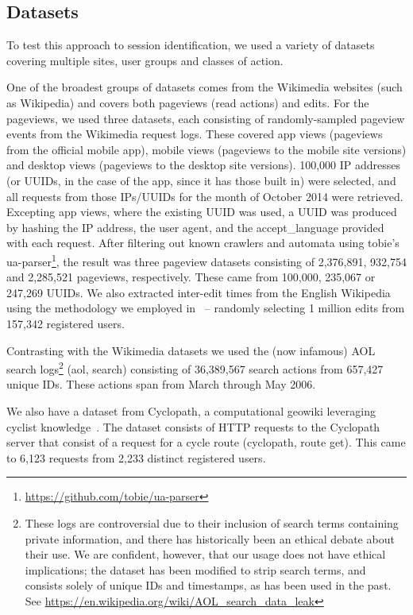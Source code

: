\subsection{Datasets}
To test this approach to session identification, we used a variety of datasets covering multiple sites, user groups and classes of action.

 One of the broadest groups of datasets comes from the Wikimedia websites (such as Wikipedia) and covers both pageviews (read actions) and edits. For the pageviews, we used three datasets, each consisting of randomly-sampled pageview events from the Wikimedia request logs. These covered app views (pageviews from the official mobile app), mobile views (pageviews to the mobile site versions) and desktop views (pageviews to the desktop site versions). 100,000 IP addresses (or UUIDs, in the case of the app, since it has those built in) were selected, and all requests from those IPs/UUIDs for the month of October 2014 were retrieved. Excepting app views, where the existing UUID was used, a UUID was produced by hashing the IP address, the user agent, and the accept\_language provided with each request. After filtering out known crawlers and automata using tobie's ua-parser\footnote{\url{https://github.com/tobie/ua-parser}}, the result was three pageview datasets consisting of 2,376,891, 932,754 and 2,285,521 pageviews, respectively. These came from 100,000, 235,067 or 247,269 UUIDs. We also extracted inter-edit times from the English Wikipedia using the methodology we employed in~\cite{geiger2013using} -- randomly selecting 1 million edits from 157,342 registered users.

 Contrasting with the Wikimedia datasets we used the (now infamous) AOL search logs\footnote{These logs are controversial due to their inclusion of search terms containing private information, and there has historically been an ethical debate about their use. We are confident, however, that our usage does not have ethical implications; the dataset has been modified to strip search terms, and consists solely of unique IDs and timestamps, as has been used in the past.\cite{mehrzadi2012onextracting}  See \url{https://en.wikipedia.org/wiki/AOL_search_data_leak}} (aol, search) consisting of 36,389,567 search actions from 657,427 unique IDs. These actions span from March through May 2006.

 We also have a dataset from Cyclopath, a computational geowiki leveraging cyclist knowledge~\cite{priedhorsky2008computational}.  The dataset consists of HTTP requests to the Cyclopath server that consist of a request for a cycle route (cyclopath, route get). This came to 6,123 requests from 2,233 distinct registered users.


